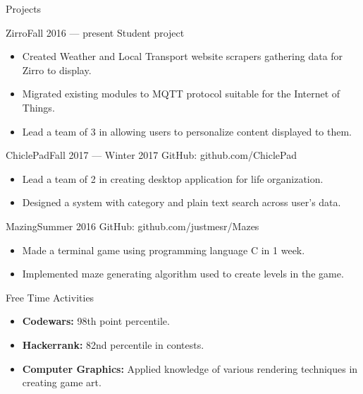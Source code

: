 \documentclass[]{mcdowellcv}
\begin{document}
	\begin{cvsection}{Projects}
		\begin{cvsubsection}{Zirro}{}{Fall 2016 — present}
			Student project
			\begin{itemize}
				\item Created Weather and Local Transport website scrapers gathering data for Zirro to display.
				\item Migrated existing modules to MQTT protocol suitable for the Internet of Things.
				\item Lead a team of 3 in allowing users to personalize content displayed to them.
			\end{itemize}
		\end{cvsubsection}

		\begin{cvsubsection}{ChiclePad}{}{Fall 2017 — Winter 2017}
			GitHub: github.com/ChiclePad
			\begin{itemize}
				\item Lead a team of 2 in creating desktop application for life organization.
				\item Designed a system with category and plain text search across user's data.
			\end{itemize}
		\end{cvsubsection}

		\begin{cvsubsection}{Mazing}{}{Summer 2016}
			GitHub: github.com/justmesr/Mazes
			\begin{itemize}
				\item Made a terminal game using programming language C in 1 week.
				\item Implemented maze generating algorithm used to create levels in the game. 
			\end{itemize}
		\end{cvsubsection}
	\end{cvsection}
	
	\begin{cvsection}{Free Time Activities}
		\begin{cvsubsection}{}{}{}	
			\begin{itemize}
				\item \textbf{Codewars:} 98th point percentile.
				\item \textbf{Hackerrank:} 82nd percentile in contests.
				\item \textbf{Computer Graphics:} Applied knowledge of various rendering techniques in creating game art.
			\end{itemize}
		\end{cvsubsection}
	\end{cvsection}
	
\end{document}
